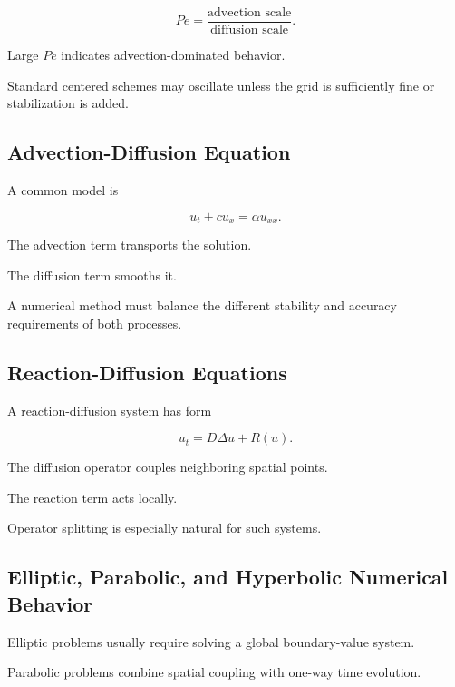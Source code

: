\[
\boxed{
Pe
=
\frac{
\text{advection scale}
}{
\text{diffusion scale}
}.
}
\]

Large \(Pe\) indicates advection-dominated behavior.

Standard centered schemes may oscillate unless the grid is sufficiently
fine or stabilization is added.

\subsection{Advection-Diffusion Equation}
\label{subsec:advection-diffusion}

A common model is

\[
\boxed{
u_t
+
cu_x
=
\alpha u_{xx}.
}
\]

The advection term transports the solution.

The diffusion term smooths it.

A numerical method must balance the different stability and accuracy
requirements of both processes.

\subsection{Reaction-Diffusion Equations}
\label{subsec:reaction-diffusion}

A reaction-diffusion system has form

\[
\boxed{
u_t
=
D\Delta u
+
R(u).
}
\]

The diffusion operator couples neighboring spatial points.

The reaction term acts locally.

Operator splitting is especially natural for such systems.

\subsection{Elliptic, Parabolic, and Hyperbolic Numerical Behavior}
\label{subsec:pde-class-behavior}

Elliptic problems usually require solving a global boundary-value system.

Parabolic problems combine spatial coupling with one-way time evolution.

